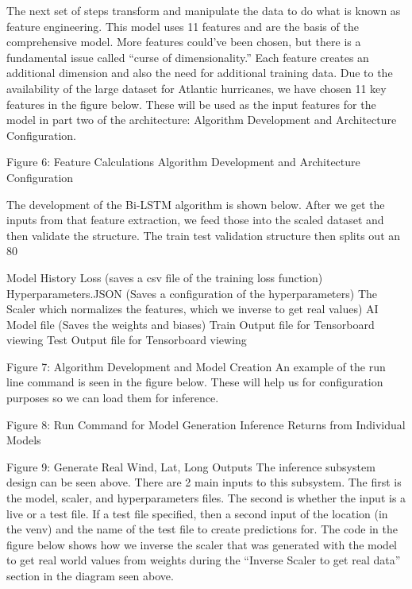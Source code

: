 \documentclass{article}
\begin{document}
The next set of steps transform and manipulate the data to do what is known as feature engineering. This model uses 11 features and are the basis of the comprehensive model. More features could’ve been chosen, but there is a fundamental issue called “curse of dimensionality.” Each feature creates an additional dimension and also the need for additional training data. Due to the availability of the large dataset for Atlantic hurricanes, we have chosen 11 key features in the figure below. These will be used as the input features for the model in part two of the architecture: Algorithm Development and Architecture Configuration.


Figure 6: Feature Calculations
Algorithm Development and Architecture Configuration

The development of the Bi-LSTM algorithm is shown below. After we get the inputs from that feature extraction, we feed those into the scaled dataset and then validate the structure. The train test validation structure then splits out an 80%

Model History Loss (saves a csv file of the training loss function)
Hyperparameters.JSON (Saves a configuration of the hyperparameters)
The Scaler which normalizes the features, which we inverse to get real values)
AI Model file (Saves the weights and biases)
Train Output file for Tensorboard viewing
Test Output file for Tensorboard viewing


Figure 7: Algorithm Development and Model Creation
An example of the run line command is seen in the figure below. These will help us for configuration purposes so we can load them for inference.


Figure 8: Run Command for Model Generation
Inference Returns from Individual Models

Figure 9: Generate Real Wind, Lat, Long Outputs
The inference subsystem design can be seen above. There are 2 main inputs to this subsystem. The first is the model, scaler, and hyperparameters files. The second is whether the input is a live or a test file. If a test file specified, then a second input of the location (in the venv) and the name of the test file to create predictions for. The code in the figure below shows how we inverse the scaler that was generated with the model to get real world values from weights during the ``Inverse Scaler to get real data'' section in the diagram seen above.
\end{document}
